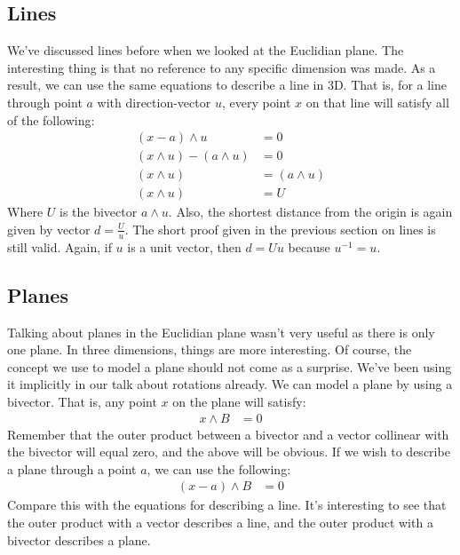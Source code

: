 \documentclass[10pt]{report}
\begin{document}
\newpage

\subsection{Lines}

We've discussed lines before when we looked at the Euclidian
plane. The interesting thing is that no reference to any specific
dimension was made. As a result, we can use the same equations to
describe a line in 3D. That is, for a line through point $a$ with
direction-vector $u$, every point $x$ on that line will satisfy
all of the following:
\begin{align*}
    (x-a)\wedge u &= 0                \nonumber \\
    (x \wedge u) - (a\wedge u) &= 0   \nonumber \\
    (x \wedge u) &= (a\wedge u)       \nonumber \\
    (x \wedge u) &= U                 \nonumber
\end{align*}
Where $U$ is the bivector $a\wedge u$. Also, the shortest distance
from the origin is again given by vector $d = \frac{U}{u}$. The
short proof given in the previous section on lines is still valid.
Again, if $u$ is a unit vector, then $d = Uu$ because $u^{-1} =
u$.

\subsection{Planes}

Talking about planes in the Euclidian plane wasn't very useful as
there is only one plane. In three dimensions, things are more
interesting. Of course, the concept we use to model a plane should
not come as a surprise. We've been using it implicitly in our talk
about rotations already. We can model a plane by using a bivector.
That is, any point $x$ on the plane will satisfy:
\begin{align*}
    x\wedge B &= 0
\end{align*}
Remember that the outer product between a bivector and a vector
collinear with the bivector will equal zero, and the above will be
obvious. If we wish to describe a plane through a point $a$, we
can use the following:
\begin{align*}
    (x-a)\wedge B &= 0
\end{align*}
Compare this with the equations for describing a line. It's
interesting to see that the outer product with a vector describes
a line, and the outer product with a bivector describes a plane.
\end{document}
